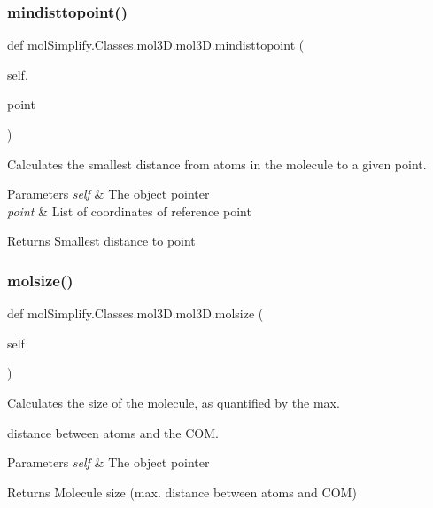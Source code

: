 \subsubsection{\texorpdfstring{mindisttopoint()}{mindisttopoint()}}
{\footnotesize\ttfamily def mol\+Simplify.\+Classes.\+mol3\+D.\+mol3\+D.\+mindisttopoint (\begin{DoxyParamCaption}\item[{}]{self,  }\item[{}]{point }\end{DoxyParamCaption})}



Calculates the smallest distance from atoms in the molecule to a given point. 


\begin{DoxyParams}{Parameters}
{\em self} & The object pointer \\
\hline
{\em point} & List of coordinates of reference point \\
\hline
\end{DoxyParams}
\begin{DoxyReturn}{Returns}
Smallest distance to point 
\end{DoxyReturn}
\mbox{\label{classmolSimplify_1_1Classes_1_1mol3D_1_1mol3D_aec0cabe05c899a3825c523add5e352ce}} 
\subsubsection{\texorpdfstring{molsize()}{molsize()}}
{\footnotesize\ttfamily def mol\+Simplify.\+Classes.\+mol3\+D.\+mol3\+D.\+molsize (\begin{DoxyParamCaption}\item[{}]{self }\end{DoxyParamCaption})}



Calculates the size of the molecule, as quantified by the max. 

distance between atoms and the C\+OM. 
\begin{DoxyParams}{Parameters}
{\em self} & The object pointer \\
\hline
\end{DoxyParams}
\begin{DoxyReturn}{Returns}
Molecule size (max. distance between atoms and C\+OM) 
\end{DoxyReturn}
\mbox{\label{classmolSimplify_1_1Classes_1_1mol3D_1_1mol3D_aab1e703e70f941dfc764a47dfdd6a121}} 
